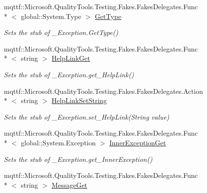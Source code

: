 \begin{DoxyCompactItemize}
mqttf\-::\-Microsoft.\-Quality\-Tools.\-Testing.\-Fakes.\-Fakes\-Delegates.\-Func\\*
$<$ global\-::\-System.\-Type $>$ \hyperlink{class_system_1_1_runtime_1_1_interop_services_1_1_fakes_1_1_stub___exception_a14d51a5a437dd2fb9c6ccf610c22bb45}{Get\-Type}
\begin{DoxyCompactList}\small\item\em Sets the stub of \-\_\-\-Exception.\-Get\-Type()\end{DoxyCompactList}\item 
mqttf\-::\-Microsoft.\-Quality\-Tools.\-Testing.\-Fakes.\-Fakes\-Delegates.\-Func\\*
$<$ string $>$ \hyperlink{class_system_1_1_runtime_1_1_interop_services_1_1_fakes_1_1_stub___exception_a04681476f269d0743d4aba6b3a8a788c}{Help\-Link\-Get}
\begin{DoxyCompactList}\small\item\em Sets the stub of \-\_\-\-Exception.\-get\-\_\-\-Help\-Link()\end{DoxyCompactList}\item 
mqttf\-::\-Microsoft.\-Quality\-Tools.\-Testing.\-Fakes.\-Fakes\-Delegates.\-Action\\*
$<$ string $>$ \hyperlink{class_system_1_1_runtime_1_1_interop_services_1_1_fakes_1_1_stub___exception_aa0feb19b8f799584355bf30be2bc9fd9}{Help\-Link\-Set\-String}
\begin{DoxyCompactList}\small\item\em Sets the stub of \-\_\-\-Exception.\-set\-\_\-\-Help\-Link(\-String value)\end{DoxyCompactList}\item 
mqttf\-::\-Microsoft.\-Quality\-Tools.\-Testing.\-Fakes.\-Fakes\-Delegates.\-Func\\*
$<$ global\-::\-System.\-Exception $>$ \hyperlink{class_system_1_1_runtime_1_1_interop_services_1_1_fakes_1_1_stub___exception_a09d6b938021be254626a6c08c59cafa5}{Inner\-Exception\-Get}
\begin{DoxyCompactList}\small\item\em Sets the stub of \-\_\-\-Exception.\-get\-\_\-\-Inner\-Exception()\end{DoxyCompactList}\item 
mqttf\-::\-Microsoft.\-Quality\-Tools.\-Testing.\-Fakes.\-Fakes\-Delegates.\-Func\\*
$<$ string $>$ \hyperlink{class_system_1_1_runtime_1_1_interop_services_1_1_fakes_1_1_stub___exception_a83da24e82deefcadc636bf399fbbac7b}{Message\-Get}

\end{DoxyCompactItemize}
